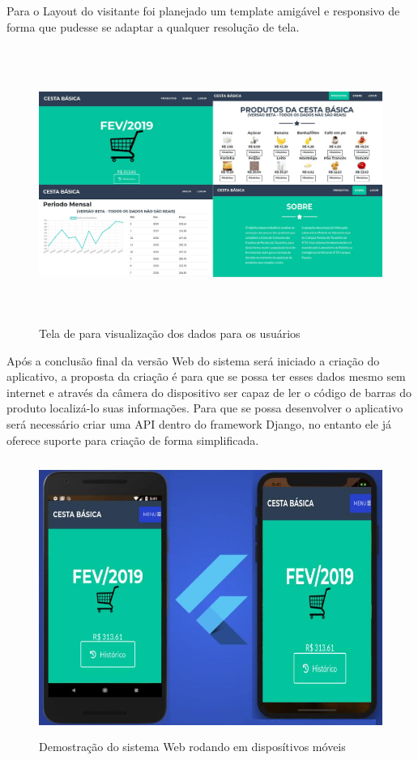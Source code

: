 \documentclass{ifto-tex}
\begin{document}
Para o Layout do visitante foi planejado um template amigável e responsivo de forma que pudesse se adaptar a qualquer resolução de tela.
	\begin{figure}[!h]
	\begin{center}
		\includegraphics[width=16.0cm, height= 9.0cm]{cestauser.jpeg}    %
		\caption{Tela de para visualização dos dados para os usuários} 
		\label{fig:faces}
	\end{center}
\end{figure}

Após a conclusão final da versão Web do sistema será iniciado a criação do aplicativo, a proposta da criação é para que se possa ter esses dados mesmo sem internet e através da câmera do dispositivo ser capaz de ler o código de barras do produto localizá-lo suas informações.
Para que se possa desenvolver o aplicativo será necessário criar uma API dentro do framework Django, no entanto ele já oferece suporte para criação de forma simplificada.

	\begin{figure}[!h]
	\begin{center}
		\includegraphics[width=16.0cm, height= 9.0cm]{cestaflutter.jpeg}    %
		\caption{Demostração do sistema Web rodando em disposítivos móveis} 
		\label{fig:faces}
	\end{center}
\end{figure}
\end{document}
